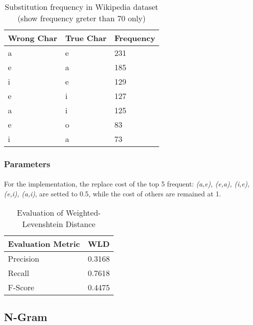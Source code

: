 \documentclass[11pt]{article}
\begin{document}
\begin{table}[!htbp]
 \begin{center}
\begin{tabular}{| l | l | l |}

      \hline
      Wrong Char & True Char & Frequency \\
      \hline\hline
	 a & e & 231 \\     
	 e & a & 185 \\
      i & e & 129 \\
      e & i & 127 \\
      a & i & 125 \\
      e & o & 83 \\
      i & a & 73 \\
      \hline

\end{tabular}
\caption{Substitution frequency in Wikipedia dataset (show frequency greter than 70 only)}\label{table4}
 \end{center}
\end{table}

\subsubsection{Parameters}

\paragraph{} For the implementation, the replace cost of the top 5 frequent: \textit{(a,e), (e,a), (i,e), (e,i), (a,i)}, are setted to 0.5, while the cost of others are remained at 1.

\begin{table}[!htbp]
 \begin{center}
\begin{tabular}{| l | l |}

      \hline
      Evaluation Metric & WLD \\
      \hline\hline
      Precision & 0.3168 \\
      Recall & 0.7618 \\
      F-Score & 0.4475 \\
      \hline

\end{tabular}
\caption{Evaluation of Weighted-Levenshtein Distance}\label{table5}
 \end{center}
\end{table}

\subsection{N-Gram}
\end{document}
